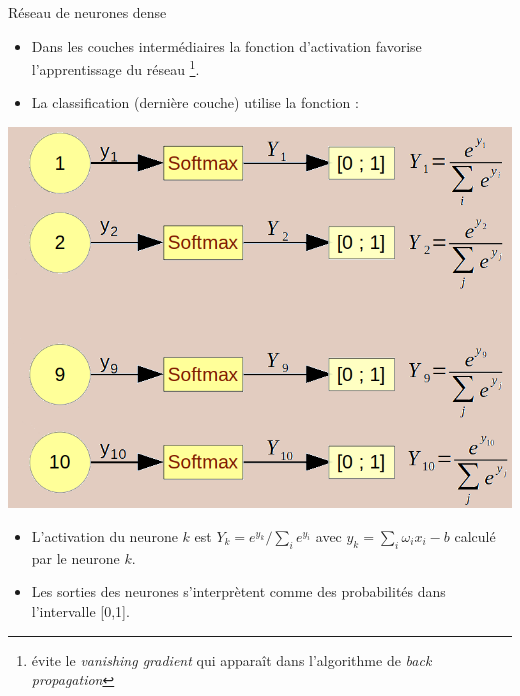 \documentclass[10pt,serif,mathserif,compress,hyperref={colorlinks}]{beamer}
\begin{document}
\begin{frame}{Réseau de neurones dense}
  \vspace*{-2mm}

  \begin{itemize}
    
  \item Dans les couches intermédiaires la fonction d'activation  favorise l'apprentissage du réseau
    \footnote{{\tiny évite le {\em vanishing gradient} qui apparaît dans
        l'algorithme de {\em back propagation}}}.

  \item La classification (dernière couche) utilise la fonction  :

  \end{itemize}

    
  \begin{tcolorbox}[title=Fonction d'activation {\em softmax}]  

    \begin{minipage}{.45\textwidth}
      \hspace*{-5mm}\includegraphics[width=1.\textwidth]{images/softmax-2.png}
    \end{minipage}
    \begin{minipage}{.6\textwidth}
      {\small
        \begin{itemize}
        \item L'activation du neurone $k$ est $Y_k = e^{y_k}/\sum_i{e^{y_i}}$ 
          avec $y_k = \sum_i \omega_i x_i - b$ calculé par le neurone $k$.
        \item Les sorties des neurones s'interprètent comme des probabilités dans l'intervalle [0,1].
        \end{itemize}
      }
    \end{minipage}
  \end{tcolorbox}

  \vspace*{-1mm}

\end{frame}
\end{document}
